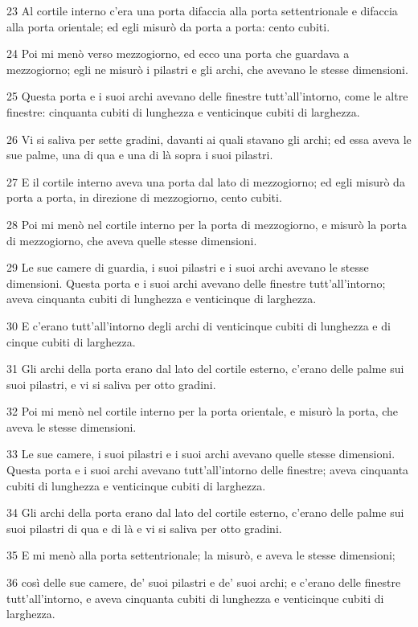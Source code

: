 \par 23 Al cortile interno c'era una porta difaccia alla porta settentrionale e difaccia alla porta orientale; ed egli misurò da porta a porta: cento cubiti.
\par 24 Poi mi menò verso mezzogiorno, ed ecco una porta che guardava a mezzogiorno; egli ne misurò i pilastri e gli archi, che avevano le stesse dimensioni.
\par 25 Questa porta e i suoi archi avevano delle finestre tutt'all'intorno, come le altre finestre: cinquanta cubiti di lunghezza e venticinque cubiti di larghezza.
\par 26 Vi si saliva per sette gradini, davanti ai quali stavano gli archi; ed essa aveva le sue palme, una di qua e una di là sopra i suoi pilastri.
\par 27 E il cortile interno aveva una porta dal lato di mezzogiorno; ed egli misurò da porta a porta, in direzione di mezzogiorno, cento cubiti.
\par 28 Poi mi menò nel cortile interno per la porta di mezzogiorno, e misurò la porta di mezzogiorno, che aveva quelle stesse dimensioni.
\par 29 Le sue camere di guardia, i suoi pilastri e i suoi archi avevano le stesse dimensioni. Questa porta e i suoi archi avevano delle finestre tutt'all'intorno; aveva cinquanta cubiti di lunghezza e venticinque di larghezza.
\par 30 E c'erano tutt'all'intorno degli archi di venticinque cubiti di lunghezza e di cinque cubiti di larghezza.
\par 31 Gli archi della porta erano dal lato del cortile esterno, c'erano delle palme sui suoi pilastri, e vi si saliva per otto gradini.
\par 32 Poi mi menò nel cortile interno per la porta orientale, e misurò la porta, che aveva le stesse dimensioni.
\par 33 Le sue camere, i suoi pilastri e i suoi archi avevano quelle stesse dimensioni. Questa porta e i suoi archi avevano tutt'all'intorno delle finestre; aveva cinquanta cubiti di lunghezza e venticinque cubiti di larghezza.
\par 34 Gli archi della porta erano dal lato del cortile esterno, c'erano delle palme sui suoi pilastri di qua e di là e vi si saliva per otto gradini.
\par 35 E mi menò alla porta settentrionale; la misurò, e aveva le stesse dimensioni;
\par 36 così delle sue camere, de' suoi pilastri e de' suoi archi; e c'erano delle finestre tutt'all'intorno, e aveva cinquanta cubiti di lunghezza e venticinque cubiti di larghezza.
